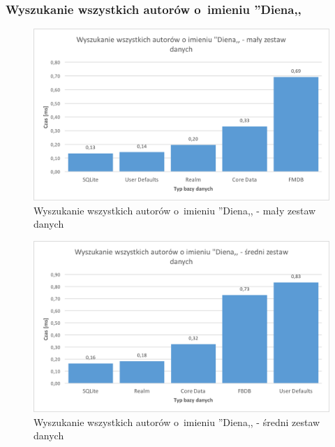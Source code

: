 \subsubsection{Wyszukanie wszystkich autorów o~imieniu ''Diena,,}

\begin{figure}[H]
\centering
	\includegraphics[width=15cm]{img/read_data/read_by_authors/read_by_author_small_test.png}
	\caption{Wyszukanie wszystkich autorów o~imieniu ''Diena,, - mały zestaw danych}
	\label{fig: read-by-author-small}
\end{figure}

\begin{figure}[H]
\centering
	\includegraphics[width=15cm]{img/read_data/read_by_authors/read_by_author_medium_test.png}
	\caption{Wyszukanie wszystkich autorów o~imieniu ''Diena,, - średni zestaw danych}
	\label{fig: read-by-author-medium}
\end{figure}

